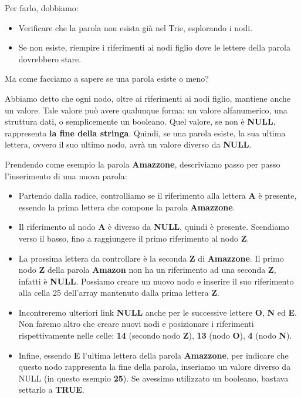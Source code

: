 \documentclass[a4paper, 12pt]{article}
\begin{document}
Per farlo, dobbiamo:
\begin{itemize}
    \item Verificare che la parola non esista già nel Trie, esplorando i nodi.
    \item Se non esiste, riempire i riferimenti ai nodi figlio dove le lettere della parola dovrebbero stare.
\end{itemize}

Ma come facciamo a sapere se una parola esiste o meno?

Abbiamo detto che ogni nodo, oltre ai riferimenti ai nodi figlio, mantiene anche un valore. Tale valore può avere qualunque forma: un valore alfanumerico, una struttura dati, o semplicemente un booleano. Quel valore, se non è \textbf{NULL}, rappresenta \textbf{la fine della stringa}. Quindi, se una parola esiste, la sua ultima lettera, ovvero il suo ultimo nodo, avrà un valore diverso da \textbf{NULL}.

Prendendo come esempio la parola \textbf{Amazzone}, descriviamo passo per passo l'inserimento di una nuova parola:

\begin{itemize}

    \item Partendo dalla radice, controlliamo se il riferimento alla lettera \textbf{A} è presente, essendo la prima lettera che compone la parola \textbf{Amazzone}.
    
    \item Il riferimento al nodo \textbf{A} è diverso da \textbf{NULL}, quindi è presente. Scendiamo verso il basso, fino a raggiungere il primo riferimento al nodo \textbf{Z}.
    
    \item La prossima lettera da controllare è la seconda \textbf{Z} di \textbf{Amazzone}. Il primo nodo \textbf{Z} della parola \textbf{Amazon} non ha un riferimento ad una seconda \textbf{Z}, infatti è \textbf{NULL}. Possiamo creare un nuovo nodo e inserire il suo riferimento alla cella 25 dell'array mantenuto dalla prima lettera \textbf{Z}.
    
    \item Incontreremo ulteriori link \textbf{NULL} anche per le successive lettere \textbf{O}, \textbf{N} ed \textbf{E}. Non faremo altro che creare nuovi nodi e posizionare i riferimenti rispettivamente nelle celle: \textbf{14} (secondo nodo \textbf{Z}), \textbf{13} (nodo \textbf{O}), \textbf{4} (nodo \textbf{N}).
    
    \item Infine, essendo \textbf{E} l'ultima lettera della parola \textbf{Amazzone}, per indicare che questo nodo rappresenta la fine della parola, inseriamo un valore diverso da NULL (in questo esempio \textbf{25}). Se avessimo utilizzato un booleano, bastava settarlo a \textbf{TRUE}.
    
\end{itemize}
\end{document}
